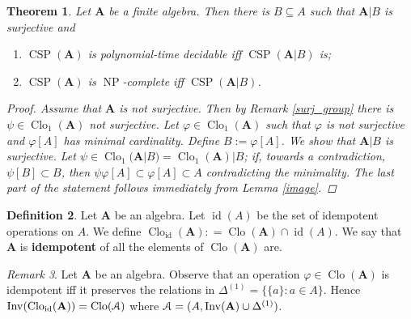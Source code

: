 \documentclass{amsart}
\theoremstyle{plain}
\newtheorem{theorem}{Theorem}[section]
\theoremstyle{definition}
\newtheorem{definition}[theorem]{Definition}
\theoremstyle{remark}
\newtheorem{remark}[theorem]{Remark}
\def\phi{\varphi}
\DeclareMathOperator{\Clo}{Clo}
\DeclareMathOperator{\CSP}{CSP}
\DeclareMathOperator{\Inv}{Inv}
\DeclareMathOperator{\NP}{NP}
\DeclareMathOperator{\id}{id}
\begin{document}
\begin{theorem}
    Let $\mathbf{A}$ be a finite algebra. 
    Then there is $B \subseteq A$ such that $\mathbf{A}|B$ is surjective and 
    \begin{enumerate}
        \item $\CSP(\mathbf{A})$ is polynomial-time decidable iff $\CSP(\mathbf{A}|B)$ is; 
        \item $\CSP(\mathbf{A})$ is $\NP$-complete iff $\CSP(\mathbf{A}|B)$.
    \end{enumerate}
    \begin{proof}
        Assume that $\mathbf{A}$ is not surjective. 
        Then by Remark \ref{surj_group} there is $\psi \in \Clo_1(\mathbf{A})$ not surjective. 
        Let $\phi \in \Clo_1(\mathbf{A})$ such that $\phi$ is not surjective and $\phi[A]$ has minimal cardinality. 
        Define $B:=\phi[A]$. 
        We show that $\mathbf{A}|B$ is surjective. 
        Let $\psi \in \Clo_1(\mathbf{A}|B) = \Clo_1(\mathbf{A})|B $;
        if, towards a contradiction, $\psi[B] \subset B$, then $\psi \phi [A] \subset \phi[A] \subset A$ contradicting the minimality. 
        The last part of the statement follows immediately from Lemma \ref{image}. 
    \end{proof}
\end{theorem}


\begin{definition}
    Let $\mathbf{A}$ be an algebra. 
    Let $\id(A)$ be the set of idempotent operations on $A$. 
    We define $\Clo_{\id}(\mathbf{A}): = \Clo(\mathbf{A}) \cap \id(A)$. 
    We say that $\mathbf{A}$ is \textbf{idempotent} of all the elements of $\Clo(\mathbf{A})$ are. 
\end{definition}

\begin{remark}
    \label{idempotent}
    Let $\mathbf{A}$ be an algebra.  
    Observe that an operation $\phi \in \Clo(\mathbf{A})$ is idempotent iff it preserves the relations in $\Delta^{(1)}=\{\{a\} : a \in A\}$. 
    Hence $\Inv(\Clo_{\id}(\mathbf{A})) = \Clo(\EuScript{A})$ where $\EuScript{A}=(A, \Inv(\mathbf{A}) \cup \Delta^{(1)})$. 
\end{remark}
\end{document}
